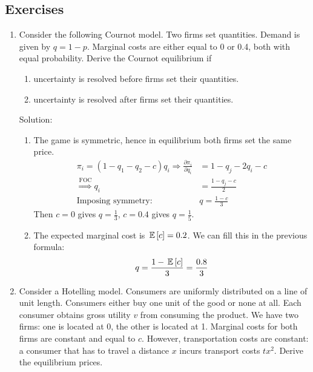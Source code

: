 \subsection{Exercises}
\begin{enumerate}
  \item Consider the following Cournot model. Two firms set quantities. Demand is given by
	$q=1-p$. Marginal costs are either equal to 0 or 0.4, both with equal probability.
	Derive the Cournot equilibrium if
	\begin{enumerate}
	  \item uncertainty is resolved before firms set their quantities.
	  \item uncertainty is resolved after firms set their quantities.
	\end{enumerate}

	Solution:
	\begin{enumerate}
		\item The game is symmetric, hence in equilibrium both firms set the same
		      price.
		      \begin{align*}
			\pi_i=(1-q_1-q_2-c)q_i\Longrightarrow\frac{\partial\pi_i}{\partial q_i} & =1-q_j-2q_i-c      \\
			\overset{\text{FOC}}{\Longrightarrow} q_i                             & =\frac{1-q_j-c}{2}\\
			\text{Imposing symmetry: }&q=\frac{1-c}{3}
		      \end{align*}
		      Then $c=0$ gives $q=\frac{1}{3}$, $c=0.4$ gives $q=\frac{1}{5}$.
		\item The expected marginal cost is $\,\mathbb{E}\left[c\right]=0.2$. We can fill this in
		      the previous formula:
		      \begin{align*}
			q=\frac{1-\,\mathbb{E}\left[c\right]}{3}=\frac{0.8}{3}
		      \end{align*}
	\end{enumerate}
  \item Consider a Hotelling model. Consumers are uniformly distributed on a line of unit
	length. Consumers either buy one unit of the good or none at all. Each consumer
	obtains gross utility $v$ from consuming the product. We have two firms: one is
	located at 0, the other is located at 1. Marginal costs for both firms are constant
	and equal to $c$. However, transportation costs are constant: a consumer that has
	to travel a distance $x$ incurs transport costs $tx^2$. Derive the equilibrium prices.


\end{enumerate}
